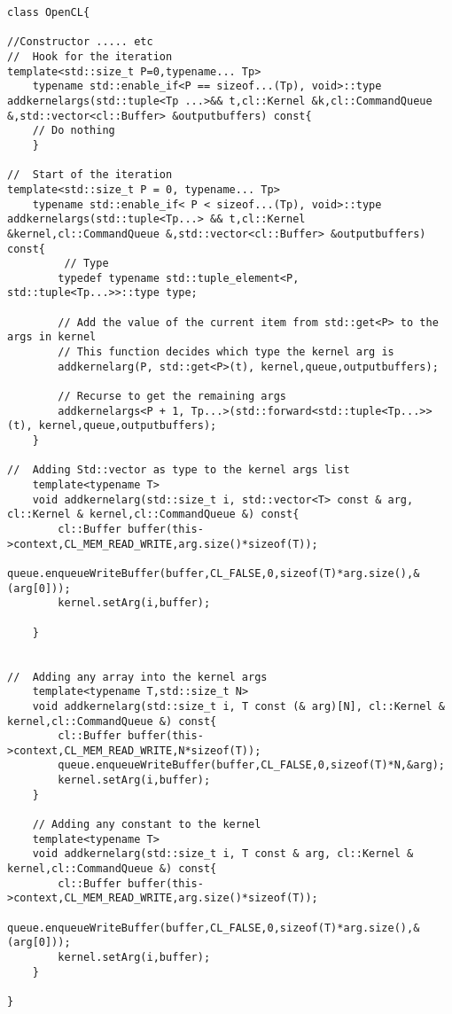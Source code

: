 \documentclass{acm_proc_article-sp}
\begin{document}
\begin{lstlisting}[caption=Add arguments to kernel dynamic way]
class OpenCL{

//Constructor ..... etc
//	Hook for the iteration
template<std::size_t P=0,typename... Tp>
	typename std::enable_if<P == sizeof...(Tp), void>::type addkernelargs(std::tuple<Tp ...>&& t,cl::Kernel &k,cl::CommandQueue &,std::vector<cl::Buffer> &outputbuffers) const{
	// Do nothing
	}

//  Start of the iteration
template<std::size_t P = 0, typename... Tp>
	typename std::enable_if< P < sizeof...(Tp), void>::type addkernelargs(std::tuple<Tp...> && t,cl::Kernel &kernel,cl::CommandQueue &,std::vector<cl::Buffer> &outputbuffers) const{
		 // Type
        typedef typename std::tuple_element<P, std::tuple<Tp...>>::type type;

        // Add the value of the current item from std::get<P> to the args in kernel
        // This function decides which type the kernel arg is
        addkernelarg(P, std::get<P>(t), kernel,queue,outputbuffers);

        // Recurse to get the remaining args
        addkernelargs<P + 1, Tp...>(std::forward<std::tuple<Tp...>>(t), kernel,queue,outputbuffers);
	}

//	Adding Std::vector as type to the kernel args list
	template<typename T>
	void addkernelarg(std::size_t i, std::vector<T> const & arg, cl::Kernel & kernel,cl::CommandQueue &) const{
		cl::Buffer buffer(this->context,CL_MEM_READ_WRITE,arg.size()*sizeof(T));
		queue.enqueueWriteBuffer(buffer,CL_FALSE,0,sizeof(T)*arg.size(),&(arg[0]));
		kernel.setArg(i,buffer);

	}


//	Adding any array into the kernel args
	template<typename T,std::size_t N>
	void addkernelarg(std::size_t i, T const (& arg)[N], cl::Kernel & kernel,cl::CommandQueue &) const{
		cl::Buffer buffer(this->context,CL_MEM_READ_WRITE,N*sizeof(T));
		queue.enqueueWriteBuffer(buffer,CL_FALSE,0,sizeof(T)*N,&arg);
		kernel.setArg(i,buffer);
	}

	// Adding any constant to the kernel
	template<typename T>
	void addkernelarg(std::size_t i, T const & arg, cl::Kernel & kernel,cl::CommandQueue &) const{
		cl::Buffer buffer(this->context,CL_MEM_READ_WRITE,arg.size()*sizeof(T));
		queue.enqueueWriteBuffer(buffer,CL_FALSE,0,sizeof(T)*arg.size(),&(arg[0]));
		kernel.setArg(i,buffer);
	}

}
\end{lstlisting}
\end{document}
